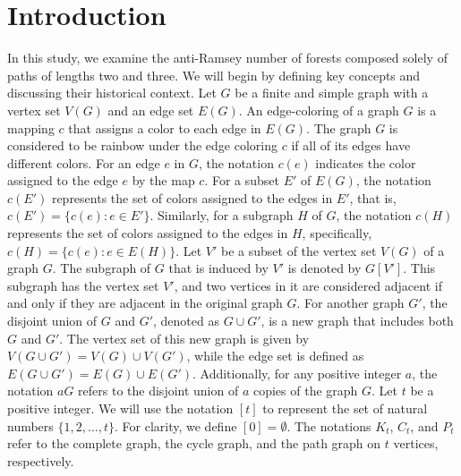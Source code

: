 \documentclass[12pt]{article}
\begin{document}
\section{Introduction}
In this study, we examine the anti-Ramsey number of forests composed solely of paths of lengths two and three. We will begin by defining key concepts and discussing their historical context.
Let \( G \) be a finite and simple graph with a vertex set \( V(G) \) and an edge set \( E(G) \). An edge-coloring of a graph \( G \) is a mapping \( c \) that assigns a color to each edge in \( E(G) \). The graph \( G \) is considered to be rainbow under the edge coloring \( c \) if all of its edges have different colors.
For an edge \( e \) in \( G \), the notation \( c(e) \) indicates the color assigned to the edge \( e \) by the map \( c \). For a subset \( E' \) of \( E(G) \), the notation \( c(E') \) represents the set of colors assigned to the edges in \( E' \), that is, \( c(E') = \{ c(e) : e \in E' \} \). Similarly, for a subgraph \( H \) of \( G \), the notation \( c(H) \) represents the set of colors assigned to the edges in \( H \), specifically, \( c(H) = \{ c(e) : e \in E(H) \} \).   
Let \( V' \) be a subset of the vertex set \( V(G) \) of a graph \( G \). The subgraph of \( G \) that is induced by \( V' \) is denoted by \( G[V'] \). This subgraph has the vertex set \( V' \), and two vertices in it are considered adjacent if and only if they are adjacent in the original graph \( G \).
For another graph \( G' \), the disjoint union of \( G \) and \( G' \), denoted as \( G \cup G' \), is a new graph that includes both \( G \) and \( G' \). The vertex set of this new graph is given by \( V(G \cup G') = V(G) \cup V(G') \), while the edge set is defined as \( E(G \cup G') = E(G) \cup E(G') \). Additionally, for any positive integer \( a \), the notation \( aG \) refers to the disjoint union of \( a \) copies of the graph \( G \).
Let \( t \) be a positive integer. We will use the notation \( [t] \) to represent the set of natural numbers \( \{ 1, 2, \ldots, t \} \). For clarity, we define \( [0] = \emptyset \). The notations \( K_t \), \(C_t\), and \( P_t \) refer to the complete graph, the cycle graph, and the path graph on \( t \) vertices, respectively.  
\end{document}
